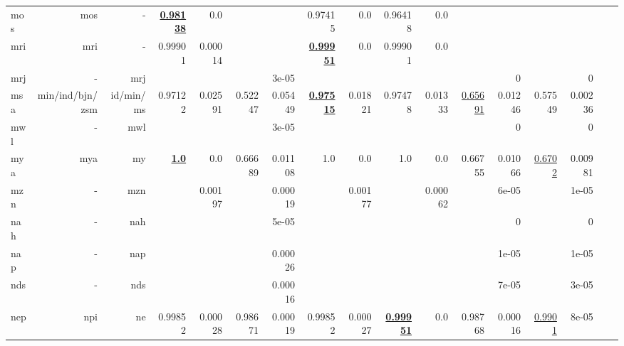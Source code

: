 \documentclass[11pt]{article}
\begin{document}
\begin{table*}[h]
{\begin{tabular}{lrrrrrrrrrrrrrrrr}
mos         & mos         & -         & \textbf{\underline{0.98138}}         & 0.0         &          &          & 0.97415         & 0.0         & 0.96418         & 0.0         &          &          &          &          \\
mri         & mri         & -         & 0.99901         & 0.00014         &          &          & \textbf{\underline{0.99951}}         & 0.0         & 0.99901         & 0.0         &          &          &          &          \\
mrj         & -         & mrj         &          &          &          & 3e-05         &          &          &          &          &          & 0         &          & 0         \\
msa         & min/ind/bjn/zsm         & id/min/ms         & 0.97122         & 0.02591         & 0.52247         & 0.05449         & \textbf{\underline{0.97515}}         & 0.01821         & 0.97478         & 0.01333         & \underline{0.65691}         & 0.01246         & 0.57549         & 0.00236         \\
mwl         & -         & mwl         &          &          &          & 3e-05         &          &          &          &          &          & 0         &          & 0         \\
mya         & mya         & my         & \textbf{\underline{1.0}}         & 0.0         & 0.66689         & 0.01108         & 1.0         & 0.0         & 1.0         & 0.0         & 0.66755         & 0.01066         & \underline{0.6702}         & 0.00981         \\
mzn         & -         & mzn         &          & 0.00197         &          & 0.00019         &          & 0.00177         &          & 0.00062         &          & 6e-05         &          & 1e-05         \\
nah         & -         & nah         &          &          &          & 5e-05         &          &          &          &          &          & 0         &          & 0         \\
nap         & -         & nap         &          &          &          & 0.00026         &          &          &          &          &          & 1e-05         &          & 1e-05         \\
nds         & -         & nds         &          &          &          & 0.00016         &          &          &          &          &          & 7e-05         &          & 3e-05         \\
nep         & npi         & ne         & 0.99852         & 0.00028         & 0.98671         & 0.00019         & 0.99852         & 0.00027         & \textbf{\underline{0.99951}}         & 0.0         & 0.98768         & 0.00016         & \underline{0.9901}         & 8e-05         \\

\end{tabular}}
\end{table*}
\end{document}
